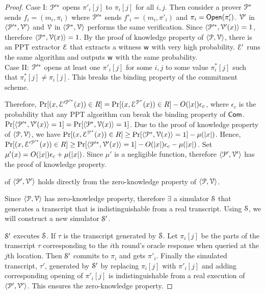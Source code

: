 \begin{proof}
	Case I: $\mathcal{P}'^\ast$ opens $\pi'_i[j]$ to $\pi_i[j]$ for all $i,j$. Then consider a prover $\mathcal{P}^\ast$ sends $f_i = (m_i,\pi_i)$ where  $\mathcal{P}'^\ast$ sends $f'_i = (m_i,\pi'_i)$ and $\pi_i = \mathsf{Open}(\pi'_i)$.
	$\mathcal{V}'$ in $\langle \mathcal{P}'^\ast,\mathcal{V}'\rangle$ and $\mathcal{V}$ in $\langle \mathcal{P}^\ast,\mathcal{V}\rangle$ performs the same verification. Since $\langle \mathcal{P}'^\ast,\mathcal{V}'({x})\rangle = 1$, therefore $\langle \mathcal{P}^\ast,\mathcal{V}({x})\rangle = 1$. By the proof of knowledge property of $\langle \mathcal{P},\mathcal{V}\rangle$, there is an PPT extractor $\mathcal{E}$ that extracts a witness $\mathsf{w}$ with very high probability. $\mathcal{E}'$ runs the same algorithm and outputs $\mathsf{w}$ with the same probability.\\
	Case II: $\mathcal{P}'^\ast$ opens at least one $\pi'_i[j]$ for some $i,j$ to some value $\pi^\ast_i[j]$ such that $\pi^\ast_i[j] \neq \pi_i[j]$. 
	This breaks the binding property of the commitment scheme.
	
	Therefore, 
	$\Pr[({x}, \mathcal{E}'^{\mathcal{P}'^\ast}({x})) \in R] = \Pr[({x}, \mathcal{E}^{\mathcal{P}^\ast}({x})) \in R] - O(|{x}|) \epsilon_c$, 
	where $\epsilon_c$ is the probability that any PPT algorithm can break the binding property of $\mathsf{Com}$.
	$\Pr[\langle \mathcal{P}'^\ast,\mathcal{V}'({x})\rangle = 1] = \Pr[\langle \mathcal{P}^\ast,\mathcal{V}({x})\rangle = 1]$.
	Due to the proof of knowledge property of $\langle \mathcal{P},\mathcal{V}\rangle$, we have 
	$\Pr[({x}, \mathcal{E}^{\mathcal{P}^\ast}({x})) \in R] \geq \Pr[\langle \mathcal{P}^\ast,\mathcal{V}({x})\rangle = 1] - \mu(|{x}|)$.
	Hence, 
	$\Pr[({x}, \mathcal{E}'^{\mathcal{P}'^\ast}({x})) \in R] \geq \Pr[\langle \mathcal{P}'^\ast,\mathcal{V}'({x})\rangle = 1] - O(|{x}|) \epsilon_c - \mu(|{x}|)$. Set $\mu'({x}) = O(|{x}|) \epsilon_c + \mu(|{x}|)$. Since $\mu'$ is a negligible function, therefore $\langle \mathcal{P}',\mathcal{V}'\rangle$ has the proof of knowledge property.
	
	 of $\langle \mathcal{P}', \mathcal{V}' \rangle$ holds directly from the zero-knowledge property of $\langle \mathcal{P}, \mathcal{V} \rangle$. 
	
	Since $\langle \mathcal{P}, \mathcal{V} \rangle$ has zero-knowledge property, therefore $\exists$ a simulator $\mathcal{S}$ that generates a transcript that is indistinguishable from a real transcript. 
	Using $\mathcal{S}$, we will construct a new simulator $\mathcal{S}'$. 
	
	$\mathcal{S}'$ executes $\mathcal{S}$. If $\tau$ is the transcript generated by $\mathcal{S}$. Let $\pi_i[j]$ be the parts of the transcript $\tau$ corresponding to the $i$th round's oracle response when queried at the $j$th location. Then $\mathcal{S}'$ commits to $\pi_i$ and gets $\pi'_i$. Finally the simulated transcript, $\tau'$, generated by $\mathcal{S}'$ by replacing $\pi_i[j]$ with $\pi'_i[j]$ and adding corresponding opening of $\pi'_i[j]$ is indistinguishable from a real execution of $\langle \mathcal{P}', \mathcal{V}' \rangle$. This ensures the zero-knowledge property.
\end{proof}

